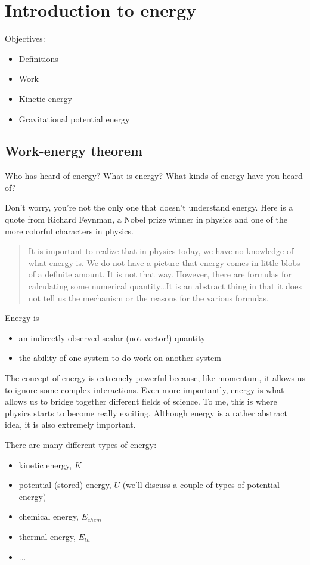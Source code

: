 \section{Introduction to energy}
Objectives:
\begin{itemize}
\item Definitions
\item Work
\item Kinetic energy
\item Gravitational potential energy
\end{itemize}

\subsection{Work-energy theorem}
Who has heard of energy? What is energy? What kinds of energy have you heard of?

Don't worry, you're not the only one that doesn't understand energy. Here is a quote from Richard Feynman, a Nobel prize winner in physics and one of the more colorful characters in physics.

\begin{quote}
It is important to realize that in physics today, we have no knowledge of what energy is. We do not have a picture that energy comes in little blobs of a definite amount. It is not that way. However, there are formulas for calculating some numerical quantity\ldots It is an abstract thing in that it does not tell us the mechanism or the reasons for the various formulas.
\end{quote}

Energy is
\begin{itemize}
\item an indirectly observed scalar (not vector!) quantity
\item the ability of one system to do work on another system
\end{itemize}

The concept of energy is extremely powerful because, like momentum, it allows us to ignore some complex interactions. Even more importantly, energy is what allows us to bridge together different fields of science. To me, this is where physics starts to become really exciting. Although energy is a rather abstract idea, it is also extremely important. 

There are many different types of energy:
\begin{itemize}
\item kinetic energy, $K$
\item potential (stored) energy, $U$ (we'll discuss a couple of types of potential energy)
\item chemical energy, $E_{chem}$
\item thermal energy, $E_{th}$
\item ...
\end{itemize}

